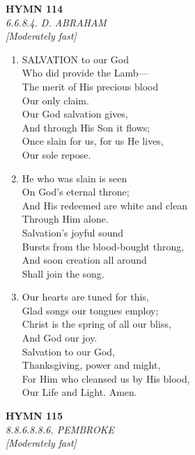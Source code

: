 \documentclass[11pt,a4paper]{article}
\begin{document}
\newpage
\begin{center}
    {\Large \textbf{HYMN 114}}
    \\
    \textit{6.6.8.4. D. ABRAHAM}
    \\
    \textit{\small [Moderately fast]}
\end{center}
\vspace{1em}

\begin{enumerate}
    \item SALVATION to our God \\
        Who did provide the Lamb--- \\
        The merit of His precious blood \\
        Our only claim. \\
        Our God salvation gives, \\
        And through His Son it flows; \\
        Once slain for us, for us He lives, \\
        Our sole repose.

    \item He who was slain is seen \\
        On God's eternal throne; \\
        And His redeemed are white and clean \\
        Through Him alone. \\
        Salvation's joyful sound \\
        Bursts from the blood-bought throng, \\
        And soon creation all around \\
        Shall join the song.

    \item Our hearts are tuned for this, \\
        Glad songs our tongues employ; \\
        Christ is the spring of all our bliss, \\
        And God our joy. \\
        Salvation to our God, \\
        Thanksgiving, power and might, \\
        For Him who cleansed us by His blood, \\
        Our Life and Light. Amen.

\end{enumerate}

\newpage
\begin{center}
    {\Large \textbf{HYMN 115}}
    \\
    \textit{8.8.6.8.8.6. PEMBROKE}
    \\
    \textit{\small [Moderately fast]}
\end{center}
\vspace{1em}
\end{document}
